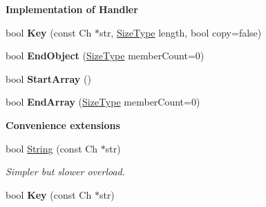 \begin{Indent}{\bf Implementation of Handler}
\begin{DoxyCompactItemize}
\item 
\hypertarget{class_pretty_writer_a26932858cdca972598f7caa6f415f310}{}bool {\bfseries Key} (const Ch $\ast$str, \hyperlink{rapidjson_8h_a5ed6e6e67250fadbd041127e6386dcb5}{Size\+Type} length, bool copy=false)\label{class_pretty_writer_a26932858cdca972598f7caa6f415f310}

\item 
\hypertarget{class_pretty_writer_a5837a63cac4735eaeedbaff287e1ab9e}{}bool {\bfseries End\+Object} (\hyperlink{rapidjson_8h_a5ed6e6e67250fadbd041127e6386dcb5}{Size\+Type} member\+Count=0)\label{class_pretty_writer_a5837a63cac4735eaeedbaff287e1ab9e}

\item 
\hypertarget{class_pretty_writer_a12dd02678ab52b9061bb6ac01cca2601}{}bool {\bfseries Start\+Array} ()\label{class_pretty_writer_a12dd02678ab52b9061bb6ac01cca2601}

\item 
\hypertarget{class_pretty_writer_a5196275e826a37a163d178da612f58f9}{}bool {\bfseries End\+Array} (\hyperlink{rapidjson_8h_a5ed6e6e67250fadbd041127e6386dcb5}{Size\+Type} member\+Count=0)\label{class_pretty_writer_a5196275e826a37a163d178da612f58f9}

\end{DoxyCompactItemize}
\end{Indent}
\begin{Indent}{\bf Convenience extensions}\par
\begin{DoxyCompactItemize}
\item 
\hypertarget{class_pretty_writer_ac6ef0185174838b7034b4183013ee073}{}bool \hyperlink{class_pretty_writer_ac6ef0185174838b7034b4183013ee073}{String} (const Ch $\ast$str)\label{class_pretty_writer_ac6ef0185174838b7034b4183013ee073}

\begin{DoxyCompactList}\small\item\em Simpler but slower overload. \end{DoxyCompactList}\item 
\hypertarget{class_pretty_writer_a0a4859ad940668cf33d18b144e5e1cdd}{}bool {\bfseries Key} (const Ch $\ast$str)\label{class_pretty_writer_a0a4859ad940668cf33d18b144e5e1cdd}

\end{DoxyCompactItemize}
\end{Indent}
